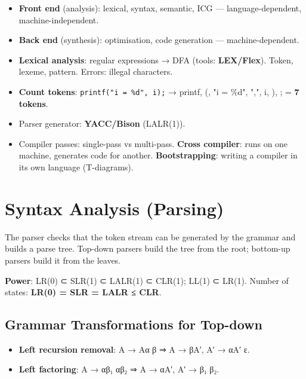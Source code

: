 \begin{itemize}
\tightlist
\item
  \textbf{Front end} (analysis): lexical, syntax, semantic, ICG --- language-dependent, machine-independent.
\item
  \textbf{Back end} (synthesis): optimisation, code generation --- machine-dependent.
\item
  \textbf{Lexical analysis}: regular expressions → DFA (tools: \textbf{LEX/Flex}). Token, lexeme, pattern. Errors: illegal characters.
\item
  \textbf{Count tokens}: \texttt{printf("i\ =\ \%d",\ i);} → printf, (, "i = \%d", ",", i, ), ; = \textbf{7 tokens}.
\item
  Parser generator: \textbf{YACC/Bison} (LALR(1)).
\item
  Compiler passes: single-pass vs multi-pass. \textbf{Cross compiler}: runs on one machine, generates code for another. \textbf{Bootstrapping}: writing a compiler in its own language (T-diagrams).
\end{itemize}

\needspace{125pt}

\hypertarget{p2-08--10-syntax-analysis-parsing}{%
\section{Syntax Analysis (Parsing)}\label{p2-08--10-syntax-analysis-parsing}}

The parser checks that the token stream can be generated by the grammar and builds a parse tree. Top-down
parsers build the tree from the root; bottom-up parsers build it from the leaves.



\textbf{Power}: LR(0) ⊂ SLR(1) ⊂ LALR(1) ⊂ CLR(1); LL(1) ⊂ LR(1). Number of states: \textbf{LR(0) = SLR = LALR ≤ CLR}.

\needspace{95pt}

\hypertarget{p2-08--101-grammar-transformations-for-top-down}{%
\subsection{Grammar Transformations for Top-down}\label{p2-08--101-grammar-transformations-for-top-down}}

\begin{itemize}
\tightlist
\item
  \textbf{Left recursion removal}: A → Aα \textbar{} β ⇒ A → βA′, A′ → αA′ \textbar{} ε.
\item
  \textbf{Left factoring}: A → αβ₁ \textbar{} αβ₂ ⇒ A → αA′, A′ → β₁ \textbar{} β₂.
\end{itemize}

